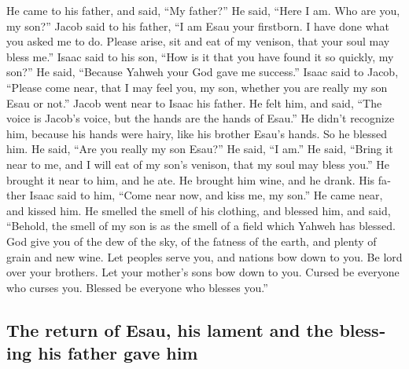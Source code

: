 \begin{paracol}{2}
\begin{otherlanguage}{english}
 He came to his father, and said, ``My father?'' He said,
``Here I am. Who are you, my son?''  Jacob said to his
father, ``I am Esau your firstborn. I have done what you asked me to do.
Please arise, sit and eat of my venison, that your soul may bless me.''
 Isaac said to his son, ``How is it that you have found
it so quickly, my son?'' He said, ``Because Yahweh your God gave me
success.''  Isaac said to Jacob, ``Please come near, that
I may feel you, my son, whether you are really my son Esau or not.''
 Jacob went near to Isaac his father. He felt him, and
said, ``The voice is Jacob's voice, but the hands are the hands of
Esau.''  He didn't recognize him, because his hands were
hairy, like his brother Esau's hands. So he blessed him. 
He said, ``Are you really my son Esau?'' He said, ``I am.''
 He said, ``Bring it near to me, and I will eat of my
son's venison, that my soul may bless you.'' He brought it near to him,
and he ate. He brought him wine, and he drank.  His
father Isaac said to him, ``Come near now, and kiss me, my son.''
 He came near, and kissed him. He smelled the smell of
his clothing, and blessed him, and said, ``Behold, the smell of my son
is as the smell of a field which Yahweh has blessed.  God
give you of the dew of the sky, of the fatness of the earth, and plenty
of grain and new wine.  Let peoples serve you, and
nations bow down to you. Be lord over your brothers. Let your mother's
sons bow down to you. Cursed be everyone who curses you. Blessed be
everyone who blesses you.''

\hypertarget{the-return-of-esau-his-lament-and-the-blessing-his-father-gave-him}{%
\subsection{The return of Esau, his lament and the blessing his father
gave
him}\label{the-return-of-esau-his-lament-and-the-blessing-his-father-gave-him}}


\end{otherlanguage}
\end{paracol}
